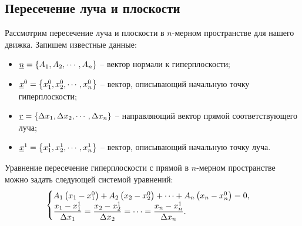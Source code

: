 \subsection{Пересечение луча и плоскости}
	
	Рассмотрим пересечение луча и плоскости в $n$-мерном пространстве для нашего движка. Запишем известные данные:
	\begin{itemize}
		\item \( \underline{n} = \left\lbrace A_1, A_2, \cdots, A_n \right\rbrace \) -- вектор нормали к гиперплоскости;
		\item \( \underline{x}^0 = \left\lbrace x_1^0, x_2^0, \cdots, x_n^0 \right\rbrace \) -- вектор, описывающий начальную точку гиперплоскости;
		\item \( \underline{r} = \left\lbrace \Delta x_1, \Delta x_2, \cdots, \Delta x_n \right\rbrace \) -- направляющий вектор прямой соответствующего луча;
		\item \( \underline{x}^1 = \left\lbrace x_1^1, x_2^1, \cdots, x_n^1 \right\rbrace \) -- вектор, описывающий начальную точку луча.
	\end{itemize}

	Уравнение пересечение гиперплоскости с прямой в $n$-мерном пространстве можно задать следующей системой уравнений:
	\[ \begin{cases} 
		A_1 \left( x_1 - x_1^0 \right) + A_2 \left( x_2 - x_2^0 \right) + \cdots + A_n \left( x_n - x_n^0 \right) = 0, \\
		\dfrac{x_1 - x_1^1}{\Delta x_1} = \dfrac{x_2 - x_2^1}{\Delta x_2} = \cdots = \dfrac{x_n - x_n^1}{\Delta x_n}.
	\end{cases} \]

